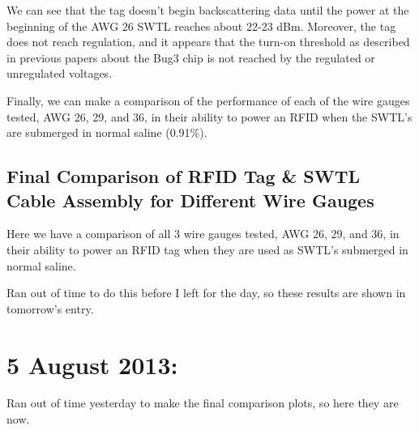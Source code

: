\documentclass[12pt,onecolumn,titlepage]{article}
\begin{document}
We can see that the tag doesn't begin backscattering data until the power at the beginning of the AWG 26 SWTL reaches about 22-23 dBm. Moreover, the tag does not reach regulation, and it appears that the turn-on threshold as described in previous papers about the Bug3 chip is not reached by the regulated or unregulated voltages. 

Finally, we can make a comparison of the performance of each of the wire gauges tested, AWG 26, 29, and 36, in their ability to power an RFID when the SWTL's are submerged in normal saline (0.91\%). 




\subsection{Final Comparison of RFID Tag \& SWTL Cable Assembly for Different Wire Gauges}
\indent \indent Here we have a comparison of all 3 wire gauges tested, AWG 26, 29, and 36, in their ability to power an RFID tag when they are used as SWTL's submerged in normal saline. 

Ran out of time to do this before I left for the day, so these results are shown in tomorrow's entry. \smiley





\clearpage
\section{5 August 2013:}

\indent \indent Ran out of time yesterday to make the final comparison plots, so here they are now.



%		
\end{document}
